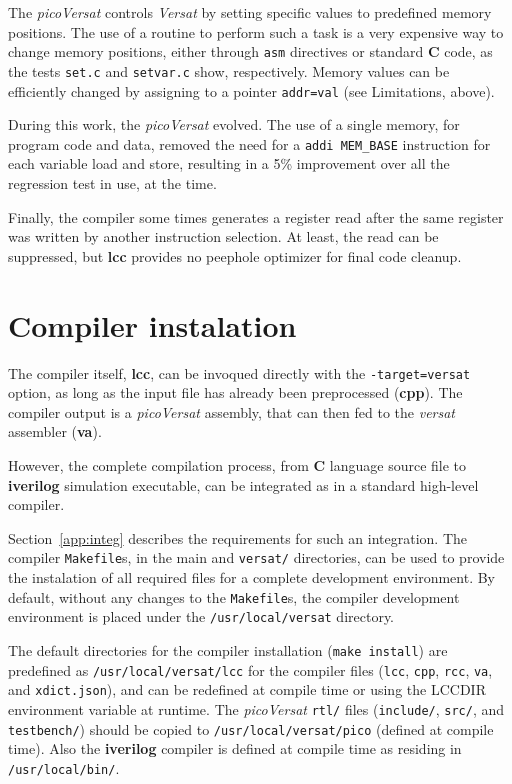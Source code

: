 The {\it picoVersat} controls {\it Versat} by setting specific values to
predefined memory positions.
The use of a routine to perform such a task is a very
expensive way to change memory positions, either through {\tt asm}
directives or standard {\bf C} code, as the tests {\tt set.c} and
{\tt setvar.c} show, respectively.
Memory values can be efficiently changed by assigning to a pointer
{\tt *addr=val} (see Limitations, above).

During this work, the {\it picoVersat} evolved. The use of a single
memory, for program code and data, removed the need for a {\tt addi MEM\_BASE}
instruction for each variable load and store, resulting in a 5\% improvement
over all the regression test in use, at the time. %

Finally, the compiler some times generates a register read after the
same register was written by another instruction selection.
At least, the read can be suppressed, but {\bf lcc} provides no
peephole optimizer for final code cleanup.

\section{Compiler instalation}

The compiler itself, {\bf lcc}, can be invoqued directly with the
{\tt -target=versat} option, as long as the input file has already
been preprocessed ({\bf cpp}).
The compiler output is a {\it picoVersat} assembly, that can then
fed to the {\it versat} assembler ({\bf va}).

However, the complete compilation process, from {\bf C} language
source file to {\bf iverilog} simulation executable, can be
integrated as in a standard high-level compiler.

Section~\ref{app:integ} describes the requirements for such an integration.
The compiler {\tt Makefile}s, in the main and {\tt versat/} directories,
can be used to provide the instalation of all required files
for a complete development environment.
By default, without any changes to the {\tt Makefile}s, the
compiler development environment is placed under the
{\tt /usr/local/versat} directory.

The default directories for the compiler installation
({\tt make install}) are predefined as
{\tt /usr/local/versat/lcc} for the compiler files
({\tt lcc}, {\tt cpp}, {\tt rcc}, {\tt va}, and
{\tt xdict.json}), and can be redefined at compile
time or using the {\sc LCCDIR} environment variable
at runtime. The {\it picoVersat} {\tt rtl/} files
({\tt include/}, {\tt src/}, and {\tt testbench/})
should be copied to {\tt /usr/local/versat/pico}
(defined at compile time).
Also the {\bf iverilog} compiler is defined at
compile time as residing in {\tt /usr/local/bin/}.

